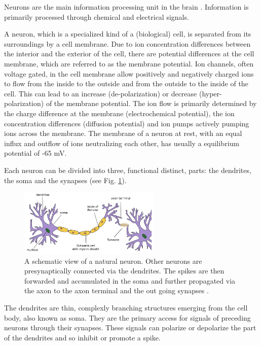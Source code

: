 Neurons are the main information processing unit in the brain \cite{Byrne1997}\cite{gerstner2014neuronal}. 
Information is primarily processed through chemical and electrical signals.

A neuron, which is a specialized kind of a (biological) cell, is separated from its surroundings by a cell membrane.   
Due to ion concentration differences between the interior and the exterior of the cell, there are potential differences at the cell membrane, which are referred to as the membrane potential. 
Ion channels, often voltage gated, in the cell membrane allow positively and negatively charged ions to flow from the inside to the outside and from the outside to the inside of the cell.
This can lead to an increase (de-polarization) or decrease (hyper-polarization) of the membrane potential.
The ion flow is primarily determined by the charge difference at the membrane (electrochemical potential), the ion concentration differences (diffusion potential) and ion pumps actively pumping ions across the membrane.
The membrane of a neuron at rest, with an equal influx and outflow of ions neutralizing each other, has usually a equilibrium potential of -65 mV. 

Each neuron can be divided into three, functional distinct, parts: the dendrites, the soma and the synapses (see Fig. \ref{fig:neuron}).

\begin{figure}[h]
	\centering
    	\includegraphics[width=0.6\textwidth]{imgs/neuron.png} 
    \caption[A schematic view of a natural neuron.]{A schematic view of a natural neuron. Other neurons are presynaptically connected via the dendrites. The spikes are then forwarded and accumulated in the soma and further propagated via the axon to the axon terminal and the out going synapses \cite{neuronImg}.}
	\label{fig:neuron}
\end{figure}

The dendrites are thin, complexly branching structures emerging from the cell body, also known as soma.
They are the primary access for signals of preceding neurons through their synapses. 
These signals can polarize or depolarize the part of the dendrites and so inhibit or promote a spike. 

